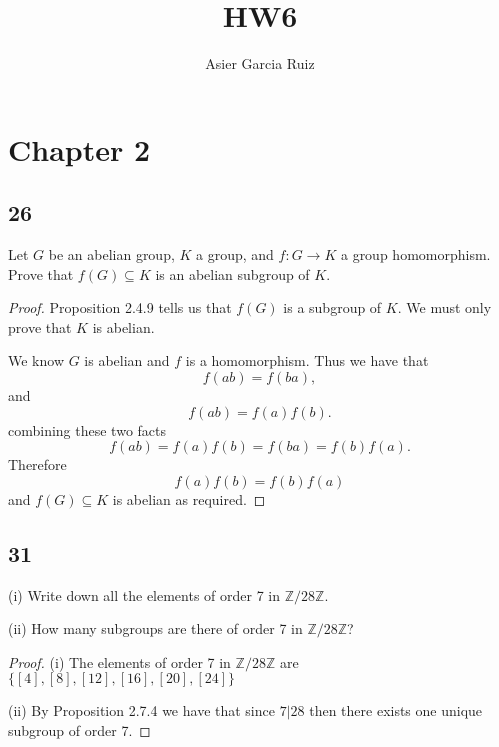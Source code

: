 \documentclass{article}
\title{HW6}
\author{Asier Garcia Ruiz}
\newcommand{\Z}{\mathbb{Z}}
\newenvironment{hwproof}[1]
{
    #1
    \begin{proof}
}{
    \end{proof}
}
\begin{document}
\maketitle

\section*{Chapter 2}
\subsection*{26}
\begin{hwproof}
    {
        Let $G$ be an abelian group, $K$ a group, and $f: G \to K$ a group homomorphism.
        Prove that $f(G) \subseteq K$ is an abelian subgroup of $K$.
    }

    Proposition 2.4.9 tells us that $f(G)$ is a subgroup of $K$. We must only
    prove that $K$ is abelian.

    We know $G$ is abelian and $f$ is a homomorphism. Thus we have that
    \begin{equation*}
        f(ab) = f(ba),
    \end{equation*}
    and
    \begin{equation*}
        f(ab) = f(a)f(b).
    \end{equation*}
    combining these two facts
    \begin{equation*}
        f(ab) = f(a)f(b) = f(ba) = f(b)f(a).
    \end{equation*}
    Therefore
    \begin{equation*}
        f(a)f(b) = f(b)f(a)
    \end{equation*}
    and $f(G) \subseteq K$ is abelian as required.
\end{hwproof}

\subsection*{31}
\begin{hwproof}
    {
        (i) Write down all the elements of order 7 in $\Z / 28\Z$.

        (ii) How many subgroups are there of order 7 in $\Z / 28\Z$?
    }
    (i) The elements of order 7 in $\Z / 28\Z$ are
    $\{[4], [8], [12], [16], [20], [24]\}$

    (ii) By Proposition 2.7.4 we have that since $7|28$ then there exists
    one unique subgroup of order 7.
\end{hwproof}
\end{document}
